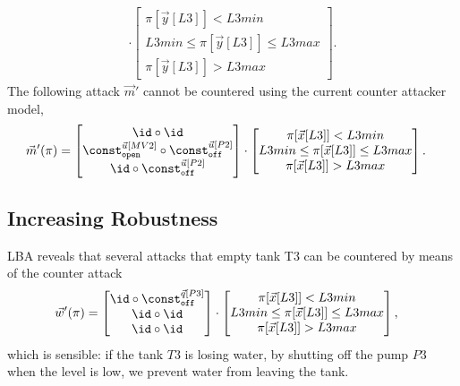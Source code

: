 {\begin{align*}
  \cdot
  \begin{bmatrix}
    \pi[\vec{y}[L3]]<L3min \\
    L3min \leq \pi[\vec{y}[L3]]\leq L3max \\
    \pi[\vec{y}[L3]]>L3max
  \end{bmatrix}.
\end{align*} 
The following attack $\vec{m}'$ cannot be countered using the current counter attacker model,
\begin{align*}
    \vec{m}'(\pi)&=
    \begin{bmatrix}
     \id\circ \id \\
     \const^{\vec{u}[MV2]}_{\texttt{open}}\circ \const^{\vec{u}[P2]}_{\texttt{off}} \\
     \id\circ \const^{\vec{u}[P2]}_{\texttt{off}} \\
    \end{bmatrix}
    \cdot
    \begin{bmatrix}
      \pi[\vec{x}[L3]]<L3min \\
      L3min \leq \pi[\vec{x}[L3]]\leq L3max \\
      \pi[\vec{x}[L3]]>L3max
    \end{bmatrix}.
  \end{align*} 

\subsection{Increasing Robustness}
LBA reveals that several attacks that empty tank T3 can be countered by means of the counter attack 
\begin{align*}
    \vec{w}'(\pi)&=
    \begin{bmatrix}
    \id\circ \const^{\vec{q}[P3]}_{\texttt{off}} \\
     \id\circ \id \\
     \id\circ \id \\
    \end{bmatrix}
    \cdot
    \begin{bmatrix}
      \pi[\vec{x}[L3]]<L3min \\
      L3min \leq \pi[\vec{x}[L3]]\leq L3max \\
      \pi[\vec{x}[L3]]>L3max
    \end{bmatrix},
  \end{align*} 
which is sensible: if the tank $T3$ is losing water, by shutting off the pump $P3$ when the level is low, we prevent water from leaving the tank.

}
